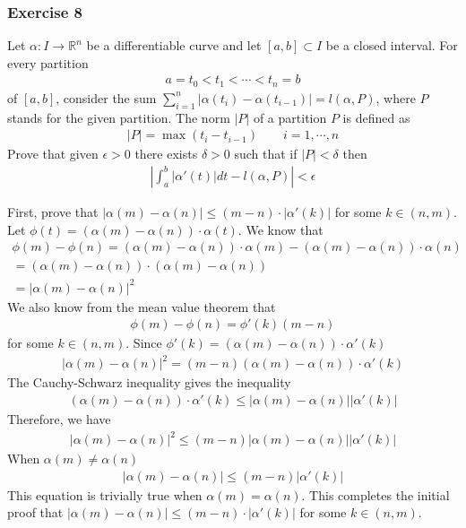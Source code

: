 \documentclass{article}
\newcommand{\R}{\mathbb{R}}
\begin{document}
	\subsubsection*{Exercise 8}
	Let $\alpha \colon I \to \R^n$ be a differentiable curve and let $[a, b] \subset I$ be a closed interval. For every partition
	\begin{gather*}
		a = t_0 < t_1 < \cdots < t_n = b
	\end{gather*}
	of $[a, b]$, consider the sum $\sum_{i = 1}^n |\alpha(t_i) - \alpha(t_{i - 1})| = l(\alpha, P)$, where $P$ stands for the given partition. The norm $|P|$ of a partition $P$ is defined as
	\begin{gather*}
		|P| = \max (t_i - t_{i - 1}) \qquad i = 1, \cdots, n
	\end{gather*}
	Prove that given $\epsilon > 0$ there exists $\delta > 0$ such that if $|P| < \delta$ then
	\begin{gather*}
		\left| \int_a^b |\alpha'(t)|dt - l(\alpha, P) \right| < \epsilon
	\end{gather*}
	
	First, prove that $|\alpha(m) - \alpha(n)| \leq (m - n) \cdot |\alpha'(k)|$ for some $k \in (n, m)$. Let $\phi(t) = (\alpha(m) - \alpha(n)) \cdot \alpha(t)$. We know that
	\begin{gather*}
		\phi(m) - \phi(n) = (\alpha(m) - \alpha(n)) \cdot \alpha(m) - (\alpha(m) - \alpha(n)) \cdot \alpha(n) \\ 
		= (\alpha(m) - \alpha(n)) \cdot (\alpha(m) - \alpha(n)) \\
		= \left| \alpha(m) - \alpha(n) \right|^2
	\end{gather*}
	We also know from the mean value theorem that
	\begin{gather*}
		\phi(m) - \phi(n) = \phi'(k) (m - n)
	\end{gather*}
	for some $k \in (n, m)$. Since $\phi'(k) = (\alpha(m) - \alpha(n)) \cdot \alpha'(k)$
	\begin{gather*}
		\left| \alpha(m) - \alpha(n) \right|^2 = (m - n) (\alpha(m) - \alpha(n)) \cdot \alpha'(k) 
	\end{gather*}
	The Cauchy-Schwarz inequality gives the inequality
	\begin{gather*}
		(\alpha(m) - \alpha(n)) \cdot \alpha'(k)  \leq \left| \alpha(m) - \alpha(n) \right| \left| \alpha'(k) \right|
	\end{gather*}
	Therefore, we have
	\begin{gather*}
		\left| \alpha(m) - \alpha(n) \right|^2 \leq (m - n) \left| \alpha(m) - \alpha(n) \right| \left| \alpha'(k) \right|
	\end{gather*}
	When $\alpha(m) \neq \alpha(n)$
	\begin{gather*}
		\left| \alpha(m) - \alpha(n) \right| \leq (m - n) \left| \alpha'(k) \right|
	\end{gather*}
	This equation is trivially true when $\alpha(m) = \alpha(n)$. This completes the initial proof that $|\alpha(m) - \alpha(n)| \leq (m - n) \cdot |\alpha'(k)|$ for some $k \in (n, m)$.
	
\end{document}
